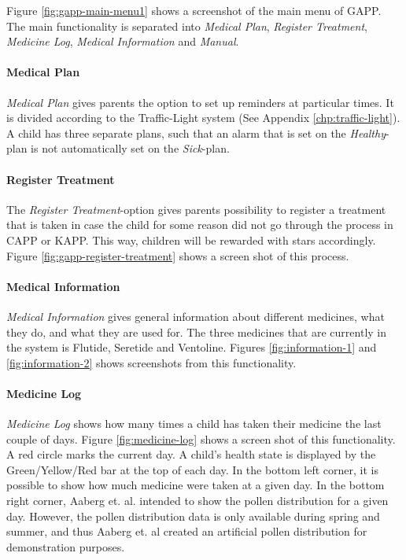 Figure \ref{fig:gapp-main-menu1} shows a screenshot of the main menu of GAPP. The main functionality is separated into 
\emph{Medical Plan}, \emph{Register Treatment}, \emph{Medicine Log}, \emph{Medical Information} and \emph{Manual}. 

\paragraph{Medical Plan}
\emph{Medical Plan} gives parents the option to set up reminders at particular times. It is divided according to the Traffic-Light system (See Appendix \ref{chp:traffic-light}). A child has three separate plans, such that an alarm that is set on the \emph{Healthy}-plan is not automatically set on the \emph{Sick}-plan.   

\paragraph{Register Treatment}
The \emph{Register Treatment}-option gives parents possibility to register a treatment that is taken in case the child for some reason did not go through the process in CAPP or KAPP. This way, children will be rewarded with stars accordingly. Figure \ref{fig:gapp-register-treatment} shows a screen shot of this process.  

\paragraph{Medical Information}
\emph{Medical Information} gives general information about different medicines, what they do, and what they are used for. The three medicines that are currently in the system is Flutide, Seretide and Ventoline. Figures \ref{fig:information-1} and \ref{fig:information-2} shows screenshots from this functionality.

\paragraph{Medicine Log}
\emph{Medicine Log} shows how many times a child has taken their medicine the last couple of days. Figure \ref{fig:medicine-log} shows a screen shot of this functionality. A red circle marks the current day. A child's health state is displayed by the Green/Yellow/Red bar at the top of each day. In the bottom left corner, it is possible to show how much medicine were taken at a given day.
In the bottom right corner, Aaberg et. al. intended to show the pollen distribution for a given day. However, the pollen distribution data is only available during spring and summer, and thus Aaberg et. al created an artificial pollen distribution for demonstration purposes. 

